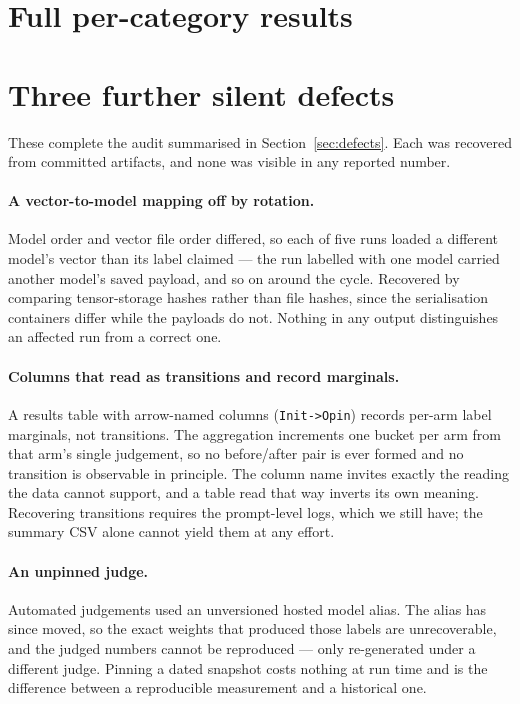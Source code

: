 \documentclass{article}
\begin{document}
\appendix
\section{Full per-category results}


\section{Three further silent defects}
\label{app:defects}

These complete the audit summarised in Section~\ref{sec:defects}. Each was
recovered from committed artifacts, and none was visible in any reported number.

\paragraph{A vector-to-model mapping off by rotation.} Model order and vector
file order differed, so each of five runs loaded a different model's vector than
its label claimed --- the run labelled with one model carried another model's
saved payload, and so on around the cycle. Recovered by comparing tensor-storage
hashes rather than file hashes, since the serialisation containers differ while
the payloads do not. Nothing in any output distinguishes an affected run from a
correct one.

\paragraph{Columns that read as transitions and record marginals.} A results
table with arrow-named columns (\texttt{Init->Opin}) records per-arm label
marginals, not transitions. The aggregation increments one bucket per arm from
that arm's single judgement, so no before/after pair is ever formed and no
transition is observable in principle. The column name invites exactly the
reading the data cannot support, and a table read that way inverts its own
meaning. Recovering transitions requires the prompt-level logs, which we still
have; the summary CSV alone cannot yield them at any effort.

\paragraph{An unpinned judge.} Automated judgements used an unversioned hosted
model alias. The alias has since moved, so the exact weights that produced those
labels are unrecoverable, and the judged numbers cannot be reproduced --- only
re-generated under a different judge. Pinning a dated snapshot costs nothing at
run time and is the difference between a reproducible measurement and a
historical one.
\end{document}

